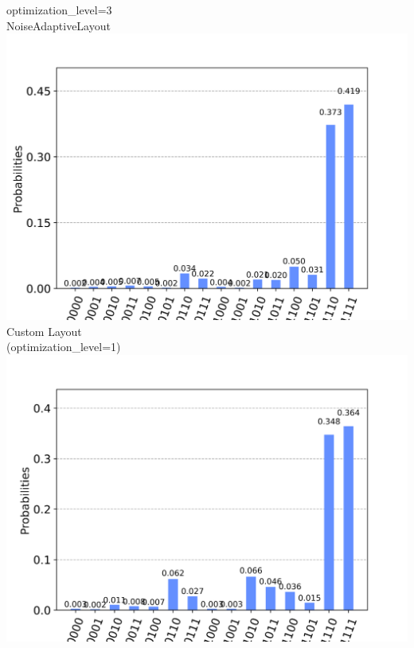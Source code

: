 \documentclass[aspectratio=169,11pt,hyperref={colorlinks=true}]{beamer}
\begin{document}
\begin{frame}
\begin{columns}
            \centering
            optimization\_level=3\\
            NoiseAdaptiveLayout\\
            \includegraphics[width=\textwidth, height=.4\textheight, keepaspectratio]{layout_3_results.png}\\
            Custom Layout\\
            (optimization\_level=1)\\
            \includegraphics[width=\textwidth, height=.4\textheight, keepaspectratio]{custom_layout_results.png}
    \end{columns}
\end{frame}
\end{document}
